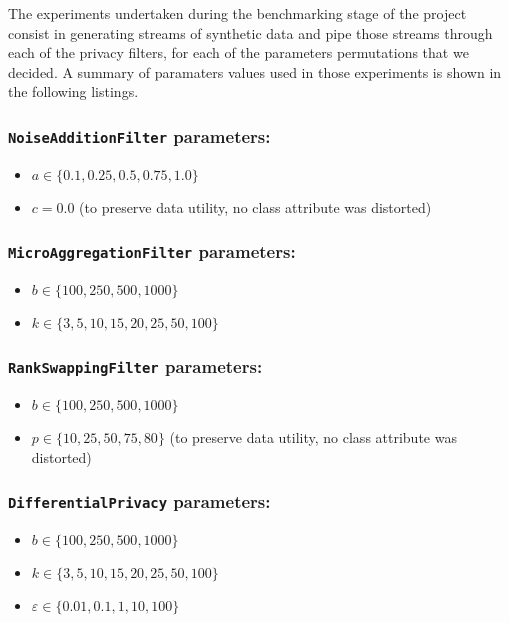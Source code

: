The experiments undertaken during the benchmarking stage of the project consist in generating streams of synthetic data and pipe those streams through each of the privacy filters, for each of the parameters permutations that we decided. A summary of paramaters values used in those experiments is shown in the following listings.

\subsubsection*{\texttt{NoiseAdditionFilter} parameters:}
\begin{itemize}
	\item $a \in \{0.1, 0.25, 0.5, 0.75, 1.0\}$
	\item $c = 0.0$ (to preserve data utility, no class attribute was distorted)
\end{itemize}

\subsubsection*{\texttt{MicroAggregationFilter} parameters:}
\begin{itemize}
	\item $b \in \{100, 250, 500, 1000\}$
	\item $k \in \{3, 5, 10, 15, 20, 25, 50, 100\}$
\end{itemize}

\subsubsection*{\texttt{RankSwappingFilter} parameters:}
\begin{itemize}
	\item $b \in \{100, 250, 500, 1000\}$
	\item $p \in \{10, 25, 50, 75, 80\}$ (to preserve data utility, no class attribute was distorted)
\end{itemize}

\subsubsection*{\texttt{DifferentialPrivacy} parameters:}
\begin{itemize}
	\item $b \in \{100, 250, 500, 1000\}$
	\item $k \in \{3, 5, 10, 15, 20, 25, 50, 100\}$
	\item $\varepsilon \in \{0.01, 0.1, 1, 10, 100\}$
\end{itemize}

